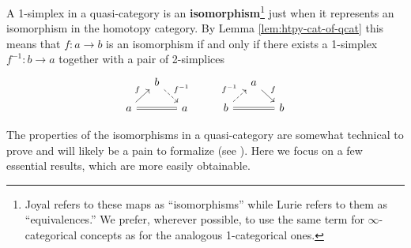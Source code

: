    \begin{defn}\label{defn:isomorphism} A 1-simplex in a quasi-category is an \textbf{isomorphism}\footnote{Joyal refers to these maps as ``isomorphisms'' while Lurie refers to them as ``equivalences.'' We prefer, wherever possible, to use the same term for $\infty$-categorical concepts as for the analogous 1-categorical ones.} just when it represents an isomorphism in the homotopy category. By Lemma \ref{lem:htpy-cat-of-qcat} this means that $f \colon a \to b$ is an isomorphism if and only if there exists a 1-simplex $f^{-1} \colon b \to a$ together with a pair of 2-simplices
   \[
   \begin{tikzcd}[row sep=small, column sep=small]
   & b \arrow[dr, "f^{-1}", dashed] & & & & a \arrow[dr, "f"] \\ a \arrow[ur, "f"] \arrow[rr, equals] & & a & & b \arrow[ur, "f^{-1}", dashed] \arrow[rr, equals] & & b
   \end{tikzcd}
   \]
   \end{defn}

   The properties of the isomorphisms in a quasi-category are somewhat technical to prove and will likely be a pain to formalize (see \cite[\S D]{RiehlVerity:2022eo}). Here we focus on a few essential results, which are more easily obtainable.




